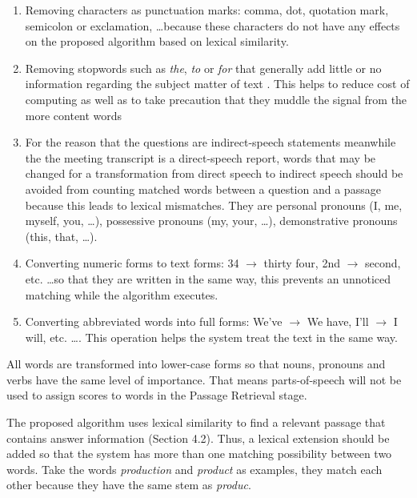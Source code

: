 \begin{enumerate}
\item {Removing characters as punctuation marks: comma, dot, quotation mark, semicolon or exclamation, \ldots because these characters do not have any effects on the proposed algorithm based on lexical similarity. } 

\item {Removing stopwords such as \textit{the}, \textit{to} or \textit{for} that generally add little or no information regarding the subject matter of text \cite{mckechnie2001cap}.  This helps to reduce cost of computing as well as to take precaution that they muddle the signal from the more content words \cite{hirschman1999drr}}

\item {For the reason that the questions are indirect-speech statements meanwhile the the meeting transcript is a direct-speech report, words that may be changed for a transformation from direct speech to indirect speech should be avoided from counting matched words between a question and a passage because this leads to lexical mismatches. They are personal pronouns (I, me, myself, you, \ldots), possessive pronouns (my, your, \ldots), demonstrative pronouns (this, that, \ldots).}



\item {Converting numeric forms to text forms: 34 \ensuremath{\rightarrow} thirty four, 2nd \ensuremath{\rightarrow} second, etc. \ldots so that they are written in the same way, this prevents an unnoticed matching while the algorithm executes. }

\item {Converting abbreviated words into full forms: We've \ensuremath{\rightarrow} We have, I'll \ensuremath{\rightarrow} I will, etc. \ldots. This operation helps the system treat the text in the same way.}
\end{enumerate}

All words are transformed into lower-case forms so that nouns, pronouns and verbs have the same level of importance. That means parts-of-speech will not be used to assign scores to words in the Passage Retrieval stage.

The proposed algorithm uses lexical similarity to find a relevant passage that contains answer information (Section 4.2). Thus, a lexical extension should be added so that the system has more than one matching possibility between two words. Take the words \textit{production} and \textit{product} as examples, they match each other because they have the same stem as \textit{produc}.

